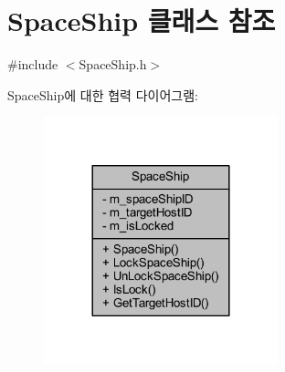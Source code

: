 \hypertarget{class_space_ship}{}\section{Space\+Ship 클래스 참조}
\label{class_space_ship}


{\ttfamily \#include $<$Space\+Ship.\+h$>$}



Space\+Ship에 대한 협력 다이어그램\+:\nopagebreak
\begin{figure}[H]
\begin{center}
\leavevmode
\includegraphics[width=192pt]{class_space_ship__coll__graph}
\end{center}
\end{figure}
